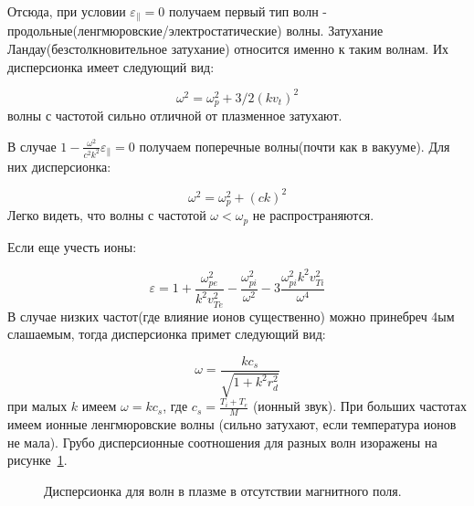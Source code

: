 \documentclass[10pt, a4paper]{article}
\numberwithin{equation}{section}
\begin{document}
Отсюда, при условии $\varepsilon_{\parallel} = 0$ получаем первый тип волн - продольные(ленгмюровские/электростатические) 
волны. Затухание Ландау(безстолкновительное затухание) относится именно к таким волнам. Их дисперсионка имеет следующий
вид:

\begin{equation}
    \label{eq.7.2}
    \omega^2=\omega_p^2 + 3/2 (k v_{t})^2
\end{equation}
волны с частотой сильно отличной от плазменное затухают.

В случае $1 - \frac{\omega^2}{c^2 k^2} \varepsilon_{\parallel}=0$ получаем поперечные волны(почти как в вакууме). Для них
дисперсионка:

\begin{equation}
    \label{eq.7.3}
    \omega^2=\omega_p^2 + (c k)^2
\end{equation}
Легко видеть, что волны с частотой $\omega < \omega_p$ не распространяются.

Если еще учесть ионы:

\begin{equation}
    \label{eq.7.4}
    \varepsilon=1+\frac{\omega_{pe}^2}{k^2 v_{Te}^2} - \frac{\omega_{pi}^2}{\omega^2}-3\frac{\omega_{pi}^2 k^2 v_{Ti}^2}{\omega^4}
\end{equation}
В случае низких частот(где влияние ионов существенно) можно принебреч 4ым слашаемым, тогда дисперсионка примет следующий вид:

\begin{equation}
    \label{eq.7.5}
    \omega=\frac{k c_s}{\sqrt{1 + k^2 r_d^2}}
\end{equation}
при малых $k$ имеем $\omega=k c_s$, где $c_s=\frac{T_i + T_e}{M}$ (ионный звук). При больших частотах имеем ионные ленгмюровские волны (сильно затухают, если температура ионов не мала). Грубо дисперсионные соотношения для разных волн изоражены на рисунке~\ref{plot.7.1}.

\begin{figure}[h!]
    \caption{\label{plot.7.1} Дисперсионка для волн в плазме в отсутствии магнитного поля.}
\end{figure}
\end{document}
